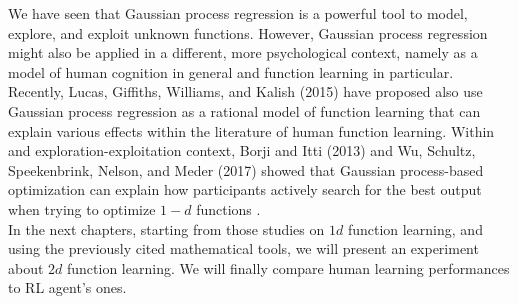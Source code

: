 We have seen that Gaussian process regression is a powerful tool to model, explore, and exploit unknown functions. However, Gaussian process regression might also be applied in a different, more psychological context, namely as a model of human cognition in general and function learning in particular. Recently, Lucas, Giffiths, Williams, and Kalish (2015) have proposed also use Gaussian process regression as a rational model of function learning that can explain various effects within the literature of human function learning. Within and exploration-exploitation context, Borji and Itti (2013) and Wu, Schultz, Speekenbrink, Nelson, and Meder (2017) showed that Gaussian process-based optimization can explain how participants actively search for the best output when trying to optimize $1-d$ functions \cite{Schulz095190}.\\

In the next chapters, starting from those studies on $1d$ function learning, and using the previously cited mathematical tools, we will present an experiment about $2d$ function learning. We will finally compare human learning performances to RL agent's ones.